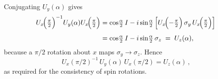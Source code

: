 \documentclass[12pt]{article}
\begin{document}
Conjugating \(U_y(\alpha)\) gives
\[
  \begin{aligned}
  U_x\!\Bigl(\tfrac{\pi}{2}\Bigr)^{-1}
  U_y(\alpha)
  U_x\!\Bigl(\tfrac{\pi}{2}\Bigr)
  &=
  \cos\!\tfrac{\alpha}{2}\,I
  -i\sin\!\tfrac{\alpha}{2}\,
    \Bigl[
       U_x\!\Bigl(-\tfrac{\pi}{2}\Bigr)\,
       \sigma_y\,
       U_x\!\Bigl(\tfrac{\pi}{2}\Bigr)
    \Bigr]\\[4pt]
  &=\cos\!\tfrac{\alpha}{2}\,I
    -i\sin\!\tfrac{\alpha}{2}\,\sigma_z
    \;=\;
    U_z(\alpha),
  \end{aligned}
\]
because a \(\pi/2\) rotation about \(x\) maps \(\sigma_y\!\to\!\sigma_z\).
Hence
\[
   \boxed{\,U_x(\pi/2)^{-1}\,U_y(\alpha)\,U_x(\pi/2)=U_z(\alpha)\,},
\]
as required for the consistency of spin rotations.

\end{document}
